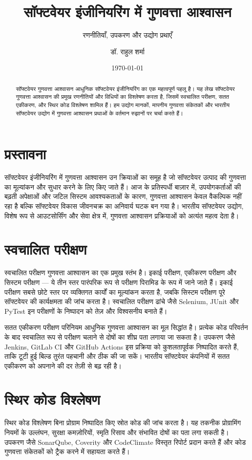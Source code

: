 \documentclass[
    language=hindi,
    doctype=article,
]{../../omnilatex}
\title{सॉफ्टवेयर इंजीनियरिंग में गुणवत्ता आश्वासन}
\subtitle{रणनीतियाँ, उपकरण और उद्योग प्रथाएँ}
\author{डॉ. राहुल शर्मा}
\date{\today}
\begin{document}
\maketitle

\begin{abstract}
सॉफ्टवेयर गुणवत्ता आश्वासन आधुनिक सॉफ्टवेयर इंजीनियरिंग का एक महत्वपूर्ण पहलू है। यह लेख सॉफ्टवेयर गुणवत्ता आश्वासन की प्रमुख रणनीतियों और विधियों का विश्लेषण करता है, जिसमें स्वचालित परीक्षण, सतत एकीकरण, और स्थिर कोड विश्लेषण शामिल हैं। हम उद्योग मानकों, मापनीय गुणवत्ता संकेतकों और भारतीय सॉफ्टवेयर उद्योग में गुणवत्ता आश्वासन प्रथाओं के वर्तमान रुझानों पर चर्चा करते हैं।
\end{abstract}

\section{प्रस्तावना}
सॉफ्टवेयर इंजीनियरिंग में गुणवत्ता आश्वासन उन क्रियाओं का समूह है जो सॉफ्टवेयर उत्पाद की गुणवत्ता का मूल्यांकन और सुधार करने के लिए किए जाते हैं। आज के प्रतिस्पर्धी बाज़ार में, उपयोगकर्ताओं की बढ़ती अपेक्षाओं और जटिल सिस्टम आवश्यकताओं के कारण, गुणवत्ता आश्वासन केवल वैकल्पिक नहीं रहा है बल्कि सॉफ्टवेयर विकास जीवनचक्र का अनिवार्य घटक बन गया है। भारतीय सॉफ्टवेयर उद्योग, विशेष रूप से आउटसोर्सिंग और सेवा क्षेत्र में, गुणवत्ता आश्वासन प्रक्रियाओं को अत्यंत महत्व देता है।

\section{स्वचालित परीक्षण}
स्वचालित परीक्षण गुणवत्ता आश्वासन का एक प्रमुख स्तंभ है। इकाई परीक्षण, एकीकरण परीक्षण और सिस्टम परीक्षण — ये तीन स्तर पारंपरिक रूप से परीक्षण पिरामिड के रूप में जाने जाते हैं। इकाई परीक्षण सबसे छोटे स्तर पर व्यक्तिगत कार्यों का मूल्यांकन करता है, जबकि सिस्टम परीक्षण पूरे सॉफ्टवेयर की कार्यक्षमता की जांच करता है। स्वचालित परीक्षण ढांचे जैसे Selenium, JUnit और PyTest इन परीक्षणों के निष्पादन को तेज़ और विश्वसनीय बनाते हैं।

सतत एकीकरण परीक्षण परिनियम आधुनिक गुणवत्ता आश्वासन का मूल सिद्धांत है। प्रत्येक कोड परिवर्तन के बाद स्वचालित रूप से परीक्षण चलाने से दोषों का शीघ्र पता लगाया जा सकता है। उपकरण जैसे Jenkins, GitLab CI और GitHub Actions इस प्रक्रिया को कुशलतापूर्वक निष्पादित करते हैं, ताकि टूटी हुई बिल्ड तुरंत पहचानी और ठीक की जा सकें। भारतीय सॉफ्टवेयर कंपनियों में सतत एकीकरण को अपनाने की दर तेज़ी से बढ़ रही है।

\section{स्थिर कोड विश्लेषण}
स्थिर कोड विश्लेषण बिना प्रोग्राम निष्पादित किए स्रोत कोड की जांच करता है। यह तकनीक प्रोग्रामिंग नियमों के उल्लंघन, सुरक्षा कमज़ोरियों, स्मृति रिसाव और संभावित दोषों का पता लगा सकती है। उपकरण जैसे SonarQube, Coverity और CodeClimate विस्तृत रिपोर्ट प्रदान करते हैं और कोड गुणवत्ता संकेतकों को ट्रैक करने में सहायता करते हैं।
\end{document}
